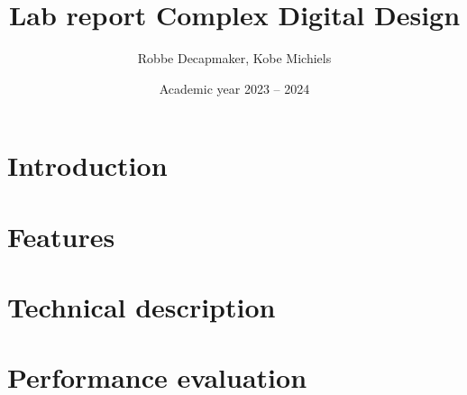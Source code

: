 \documentclass[a4paper,kul]{kulakarticle} %
\date{Academic year 2023 -- 2024}
\title{Lab report Complex Digital Design}
\author{Robbe Decapmaker, Kobe Michiels}
\begin{document}
\maketitle
\section{Introduction}

\section{Features}


\section{Technical description}


\section{Performance evaluation}

\end{document}
